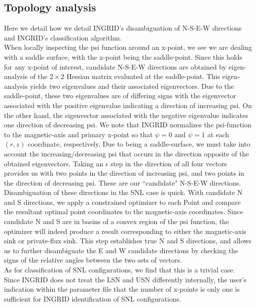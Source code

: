 \subsection{Topology analysis}
Here we detail how we detail INGRID's disambiguation of N-S-E-W directions and INGRID's classification algorithm.\\ \indent
When locally inspecting the psi function around an x-point, we see we are dealing with a saddle surface, with the x-point being the saddle-point. Since this holds for any x-point of interest, candidate N-S-E-W directions are obtained by eigen-analysis of the $2\times2$ Hessian matrix evaluated at the saddle-point. This eigen-analysis yields two eigenvalues and their associated eigenvectors. Due to the saddle-point, these two eigenvalues are of differing signs with the eigenvector associated with the positive eigenvalue indicating a direction of increasing psi. On the other hand, the eigenvector associated with the negative eigenvalue indicates one direction of decreasing psi. We note that INGRID normalizes the psi-function to the magnetic-axis and primary x-point so that $\psi = 0$ and $\psi=1$ at each $(r,z)$ coordinate, respectively. Due to being a saddle-surface, we must take into account the increasing/decreasing psi that occurs in the direction opposite of the obtained eigenvectors. Taking an $\epsilon$ step in the direction of all four vectors provides us with two points in the direction of increasing psi, and two points in the direction of decreasing psi. These are our ``candidate" N-S-E-W directions.\\ \indent
Disambiguation of these directions in the SNL case is quick. With candidate N and S directions, we apply a constrained optimizer to each Point and compare the resultant optimal point coordinates to the magnetic-axis coordinates. Since candidate N and S are in basins of a convex region of the psi function, the optimizer will indeed produce a result corresponding to either the magnetic-axis sink or private-flux sink. This step establishes true N and S directions, and allows us to further disambiguate the E and W candidate directions by checking the signs of the relative angles between the two sets of vectors.\\ \indent
As for classification of SNL configurations, we find that this is a trivial case. Since INGRID does not treat the LSN and USN differently internally, the user's indication within the parameter file that the number of x-points is only one is sufficient for INGRID identification of SNL configurations.\\ \indent
